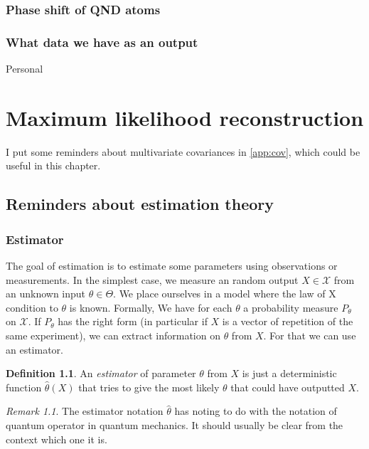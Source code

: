 \documentclass[10pt]{report}
\theoremstyle{plain}
\theoremstyle{definition}
\newtheorem{defn}{Definition}[chapter]
\theoremstyle{remark}
\newtheorem*{rem}{Remark}
\begin{document}
\subsection{Phase shift of QND atoms}

\subsection{What data we have as an output}

Personal





\chapter{Maximum likelihood reconstruction}

I put some reminders about multivariate covariances in
\cref{app:cov}, which could be useful in this chapter.

\section{Reminders about estimation theory}

\subsection{Estimator}

The goal of estimation is to estimate some parameters using observations or
measurements. In the simplest case, we measure an random output $X \in \mathcal{X}$ from an
unknown input $\theta \in \Theta$. We place ourselves in a model where the law
of X condition to $\theta$ is known. Formally, We have for each $\theta$ a
probability measure $P_\theta$ on $\mathcal{X}$. If $P_\theta$ has the right
form (in particular if $X$ is a vector of repetition of the same experiment), we
can extract information on $\theta$ from $X$. For that we can use an estimator.

\begin{defn}
  An \emph{estimator} of parameter $\theta$ from $X$ is just a deterministic
  function $\hat \theta(X)$ that tries to give the most likely $\theta$ that
  could have outputted $X$.
\end{defn}

\begin{rem}
  The estimator notation $\hat \theta$ has noting to do with the notation of
  quantum operator in quantum mechanics. It should usually be clear from the
  context which one it is.
\end{rem}
\end{document}

